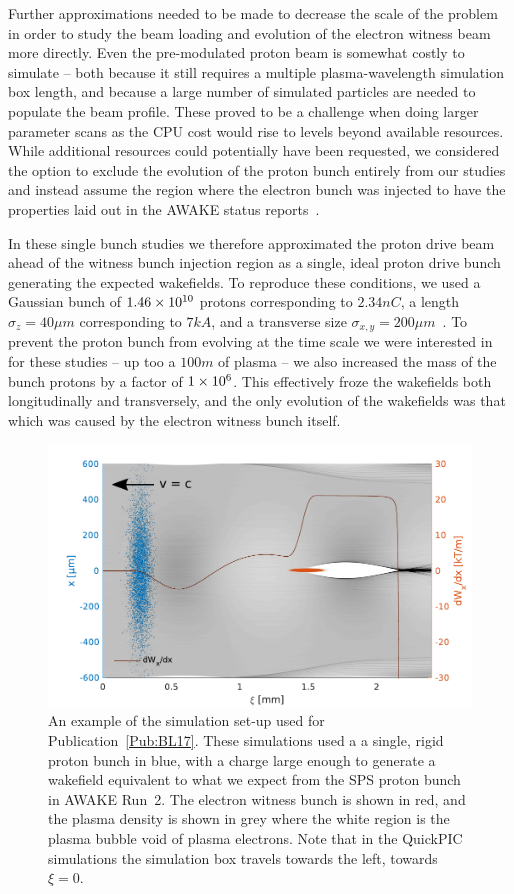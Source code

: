 Further approximations needed to be made to decrease the scale of the problem in order to study the beam loading and evolution of the electron witness beam more directly.
Even the pre-modulated proton beam is somewhat costly to simulate -- both because it still requires a multiple plasma-wavelength simulation box length, and because a large number of simulated particles are needed to populate the beam profile.
These proved to be a challenge when doing larger parameter scans as the CPU cost would rise to levels beyond available resources.
While additional resources could potentially have been requested, we considered the option to exclude the evolution of the proton bunch entirely from our studies and instead assume the region where the electron bunch was injected to have the properties laid out in the AWAKE status reports~\cite{awake_collaboration:2016}.

In these single bunch studies we therefore approximated the proton drive beam ahead of the witness bunch injection region as a single, ideal proton drive bunch generating the expected wakefields.
To reproduce these conditions, we used a Gaussian bunch of $1.46\times 10^{10}$ protons corresponding to $2.34\unit{nC}$, a length $\sigma_{z} = 40\unit{\mu m}$ corresponding to $7\unit{kA}$, and a transverse size $\sigma_{x,y}=200\unit{\mu m}$~\cite{berglyd_olsen:2018}.
To prevent the proton bunch from evolving at the time scale we were interested in for these studies -- up too a $100\unit{m}$ of plasma -- we also increased the mass of the bunch protons by a factor of $1\times 10^{6}$.
This effectively froze the wakefields both longitudinally and transversely, and the only evolution of the wakefields was that which was caused by the electron witness bunch itself.

\begin{figure}[hbt]
    \centering
    \includegraphics[width=0.8125\linewidth,trim={0mm 0mm 0mm 0mm},clip]{figures/SingleBunchPB}
    \caption{\label{Fig:PBSingle}
        An example of the simulation set-up used for Publication~\ref{Pub:BL17}.
        These simulations used a a single, rigid proton bunch in blue, with a charge large enough to generate a wakefield equivalent to what we expect from the SPS proton bunch in AWAKE Run~2.
        The electron witness bunch is shown in red, and the plasma density is shown in grey where the white region is the plasma bubble void of plasma electrons.
        Note that in the QuickPIC simulations the simulation box travels towards the left, towards $\xi = 0$.
    }
\end{figure}

